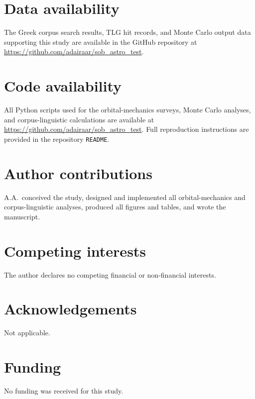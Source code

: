 \documentclass[sn-nature]{sn-jnl}
\begin{document}

\section*{Data availability}
The Greek corpus search results, TLG hit records, and Monte Carlo output data
supporting this study are available in the GitHub repository at
\url{https://github.com/adairaar/sob_astro_test}.

\section*{Code availability}
All Python scripts used for the orbital-mechanics surveys, Monte Carlo
analyses, and corpus-linguistic calculations are available at
\url{https://github.com/adairaar/sob_astro_test}. Full reproduction
instructions are provided in the repository \texttt{README}.

\section*{Author contributions}
A.A.\ conceived the study, designed and implemented all orbital-mechanics and
corpus-linguistic analyses, produced all figures and tables, and wrote the
manuscript.

\section*{Competing interests}
The author declares no competing financial or non-financial interests.

\section*{Acknowledgements}
Not applicable.

\section*{Funding}
No funding was received for this study.



\end{document}
